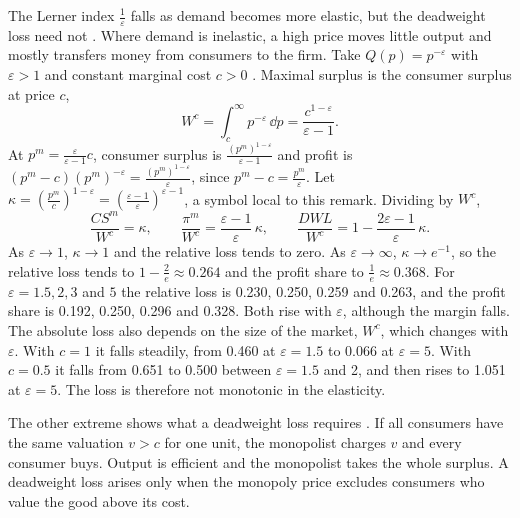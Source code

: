 \begin{remark}\label{rem:02-dwl-elasticity}
The Lerner index $\frac{1}{\varepsilon}$ falls as demand becomes more elastic, but the deadweight loss need not
\citep[sec.~1.1.1.2]{Tirole1988}. Where demand is inelastic, a high price moves little output and mostly transfers
money from consumers to the firm. Take $Q(p) = p^{-\varepsilon}$ with $\varepsilon > 1$ and constant marginal cost
$c > 0$ \citep[Exercise~1.1]{Tirole1988}. Maximal surplus is the consumer surplus at price $c$,
\[
  W^c = \int_c^{\infty} p^{-\varepsilon}\,\dd p = \frac{c^{1 - \varepsilon}}{\varepsilon - 1} .
\]
At $p^m = \frac{\varepsilon}{\varepsilon - 1}c$, consumer surplus is $\frac{(p^m)^{1 - \varepsilon}}{\varepsilon - 1}$
and profit is $(p^m - c)(p^m)^{-\varepsilon} = \frac{(p^m)^{1 - \varepsilon}}{\varepsilon}$, since $p^m - c =
\frac{p^m}{\varepsilon}$. Let $\kappa = \left(\frac{p^m}{c}\right)^{1 - \varepsilon} = \left(\frac{\varepsilon -
1}{\varepsilon}\right)^{\varepsilon - 1}$, a symbol local to this remark. Dividing by $W^c$,
\[
  \frac{CS^m}{W^c} = \kappa, \qquad \frac{\pi^m}{W^c} = \frac{\varepsilon - 1}{\varepsilon}\,\kappa, \qquad
  \frac{\mathit{DWL}}{W^c} = 1 - \frac{2\varepsilon - 1}{\varepsilon}\,\kappa .
\]
As $\varepsilon \to 1$, $\kappa \to 1$ and the relative loss tends to zero. As $\varepsilon \to \infty$,
$\kappa \to e^{-1}$, so the relative loss tends to $1 - \frac{2}{e} \approx 0.264$ and the profit share to
$\frac{1}{e} \approx 0.368$. For $\varepsilon = 1.5, 2, 3$ and $5$ the relative loss is 0.230, 0.250, 0.259 and
0.263, and the profit share is 0.192, 0.250, 0.296 and 0.328. Both rise with $\varepsilon$, although the margin
falls. The absolute loss also depends on the size of the market, $W^c$, which changes with $\varepsilon$. With
$c = 1$ it falls steadily, from 0.460 at $\varepsilon = 1.5$ to 0.066 at $\varepsilon = 5$. With $c = 0.5$ it falls
from 0.651 to 0.500 between $\varepsilon = 1.5$ and 2, and then rises to 1.051 at $\varepsilon = 5$. The loss is
therefore not monotonic in the elasticity.

The other extreme shows what a deadweight loss requires \citep[Exercise~1.2]{Tirole1988}. If all consumers have the
same valuation $v > c$ for one unit, the monopolist charges $v$ and every consumer buys. Output is efficient and the
monopolist takes the whole surplus. A deadweight loss arises only when the monopoly price excludes consumers who
value the good above its cost.
\end{remark}

